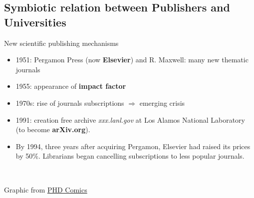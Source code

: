 \documentclass[10pt,compress,serif,aspectratio=169]{beamer}
\newcommand{\fig}[2]{\centering{\texttt{[image: \#2]}}}
\begin{document}

  \subsection{Symbiotic relation between Publishers and Universities}

 \begin{frame}[t]{New scientific publishing mechanisms}
\begin{itemize}

 \item 1951: Pergamon Press (now \textbf{Elsevier}) and R. Maxwell: many new thematic journals
 \item 1955: appearance of \textbf{impact factor}
 \item 1970s: rise of journals subscriptions $\Rightarrow$ emerging crisis
 \item 1991: creation free archive \textit{xxx.lanl.gov} at Los Alamos National Laboratory (to become \textbf{arXiv.org}).
\item By 1994, three years after acquiring Pergamon, Elsevier had raised its prices by 50\%. Librarians began cancelling subscriptions to less popular journals.
\end{itemize}

\fig{.35}{Open_Access_PhD_Comics}
\hspace{1cm}
\fig{.3}{price_increase_publisher_phd_comics}\\
  \begin{center}
    \small
    Graphic from \href{http://www.phdcomics.com/comics.php?f=1533}{PHD Comics}
  \end{center}
\end{frame}
\end{document}
